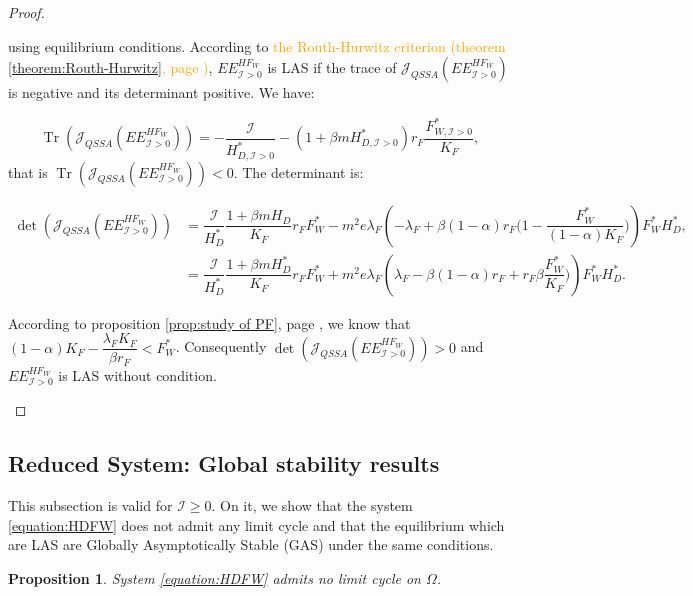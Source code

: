 \documentclass{article}
\newcommand{\lfw}{\lambda_{F}}
\newcommand{\lfw}{\lambda_{F}}
\newcommand{\cI}{\mathcal{I}}
\newcommand{\vdeux}[1]{\textcolor{orange}{#1}}
\DeclareMathOperator{\Tr}{Tr}
\newtheorem{prop}[theorem]{Proposition}
\theoremstyle{definition}
\theoremstyle{remark}
\begin{document}
\begin{proof}
\begin{itemize}
using equilibrium conditions.  According to \vdeux{the Routh-Hurwitz criterion (theorem \ref{theorem:Routh-Hurwitz}, page \pageref{theorem:Routh-Hurwitz})},  $EE^{HF_W}_{\cI > 0}$ is LAS if the trace of $\mathcal{J}_{QSSA}(EE^{HF_W}_{\cI > 0}) $ is negative and its determinant positive. We have:

\begin{equation*}
\Tr(\mathcal{J}_{QSSA}(EE^{HF_W}_{\cI > 0})) = -\dfrac{\cI}{H^*_{D, \cI > 0}} -(1+\beta m H^*_{D, \cI > 0}) r_F \dfrac{F^*_{W, \cI > 0}}{K_F}, 
\end{equation*}
that is $\Tr(\mathcal{J}_{QSSA}(EE^{HF_W}_{\cI > 0})) < 0$.
The determinant is:

\begin{align*}
\det(\mathcal{J}_{QSSA}(EE^{HF_W}_{\cI > 0})) &= \dfrac{\cI}{H_D^*} \dfrac{1 + \beta m H_D}{K_F} r_F F_W^* - m^2 e \lfw \left(-\lfw + \beta(1-\alpha)r_F \Big(1- \dfrac{F_W^*}{(1-\alpha) K_F} \Big) \right) F_W^* H_D^*, \\
&= \dfrac{\cI}{H_D^*} \dfrac{1 + \beta m H_D^*}{K_F} r_F F_W^* + m^2 e \lfw \left(\lfw - \beta(1-\alpha)r_F + r_F \beta\dfrac{F_W^*}{ K_F} \Big) \right) F_W^* H_D^*.
\end{align*}

According to proposition \ref{prop:study of PF}, page \pageref{prop:study of PF}, we know that $(1-\alpha)K_F - \dfrac{\lfw K_F}{\beta r_F} < F_W^*$. Consequently $\det(\mathcal{J}_{QSSA}(EE^{HF_W}_{\cI > 0})) > 0$ and $EE^{HF_W}_{\cI > 0}$ is LAS without condition.
\end{itemize}
\end{proof}

\subsection{Reduced System: Global stability results}
This subsection is valid for $\cI \geq 0$. On it, we show that the system \eqref{equation:HDFW} does not admit any limit cycle and that the equilibrium which are LAS are Globally Asymptotically Stable (GAS) under the same conditions.  

\begin{prop} \label{prop:no limit cycle, 2D}
System \eqref{equation:HDFW} admits no limit cycle on $\Omega$.
\end{prop}
\end{document}
